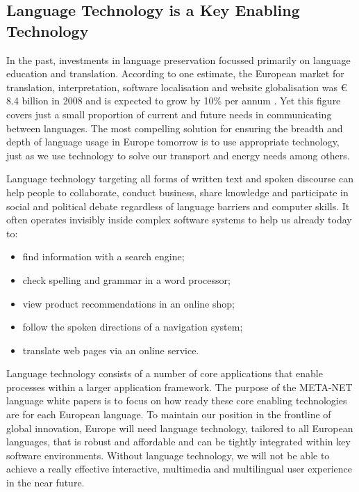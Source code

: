 \begin{multicols}{2}
\subsection{Language Technology is a Key Enabling Technology}

In the past, investments in language preservation focussed primarily on language education and translation. According to one estimate, the European market for translation, interpretation, software localisation and website globalisation was € 8.4 billion in 2008 and is expected to grow by 10\% per annum \cite{str5}. Yet this figure covers just a small proportion of current and future needs in communicating between languages. The most compelling solution for ensuring the breadth and depth of language usage in Europe tomorrow is to use appropriate technology, just as we use technology to solve our transport and energy needs among others.

Language technology targeting all forms of written text and spoken discourse can help people to collaborate, conduct business, share knowledge and participate in social and political debate regardless of language barriers and computer skills. It often operates invisibly inside complex software systems to help us already today to:

\begin{itemize}
\item find information with a search engine;
\item check spelling and grammar in a word processor;
\item view product recommendations in an online shop;
\item follow the spoken directions of a navigation system;
\item translate web pages via an online service.
\end{itemize}

Language technology consists of a number of core applications that enable processes within a larger application framework. The purpose of the META-NET language white papers is to focus on how ready these core enabling technologies are for each European language. To maintain our position in the frontline of global innovation, Europe will need language technology, tailored to all European languages, that is robust and affordable and can be tightly integrated within key software environments. Without language technology, we will not be able to achieve a really effective interactive, multimedia and multilingual user experience in the near future.


\end{multicols}
